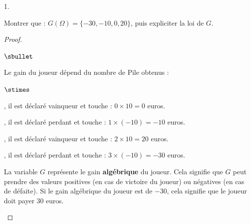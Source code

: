 \documentclass[11pt]{article}%
\begin{document}
\begin{noliste}{1.}
\item Montrer que : $G(\Omega) = \{-30, -10, 0, 20\}$, puis expliciter
  la loi de $G$.

  \begin{proof}~%
    \begin{noliste}{$\sbullet$}
    \item Le gain du joueur dépend du nombre de Pile obtenus : 
      \begin{noliste}{$\stimes$}
      \item {}, il est déclaré
        vainqueur et touche : $0 \times 10 = 0$ euros.

      \item {}, il est déclaré
        perdant et touche : $1 \times (-10) = -10$ euros.

      \item {}, il est déclaré
        vainqueur et touche : $2 \times 10 = 20$ euros.

      \item {}, il est déclaré
        perdant et touche : $3 \times (-10) = -30$ euros.
      \end{noliste}
      \begin{remark}%
        La variable $G$ représente le gain {\bf algébrique} du
        joueur. Cela signifie que $G$ peut prendre des valeurs
        positives (en cas de victoire du joueur) ou négatives (en cas
        de défaite). Si le gain algébrique du joueur est de $-30$,
        cela signifie que le joueur doit payer $30$ euros.
      \end{remark}


      \newpage



\end{noliste}
\end{proof}
\end{noliste}
\end{document}

